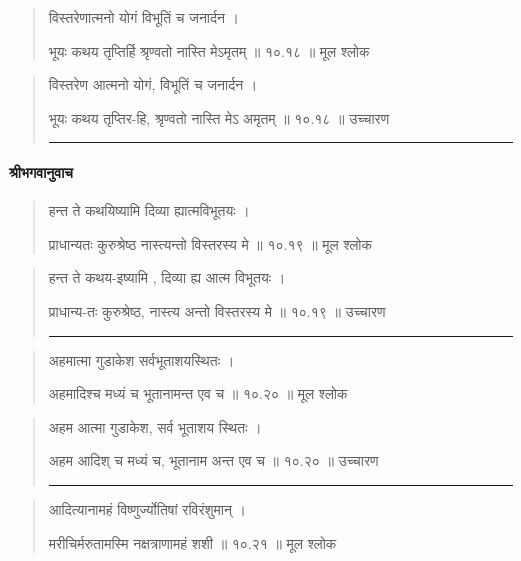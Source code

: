 \begin{quotation} 

विस्तरेणात्मनो योगं विभूतिं च जनार्दन  ।  

भूयः कथय तृप्तिर्हि श्रृण्वतो नास्ति मेऽमृतम्‌  ॥ १०.१८ ॥  मूल श्लोक
\end{quotation}

\begin{quotation}

विस्तरेण आत्मनो योगं, विभूतिं च जनार्दन  ।  

भूयः कथय तृप्तिर-हि, श्रृण्वतो नास्ति मेऽ अमृतम्‌  ॥ १०.१८ ॥  उच्चारण

\noindent\rule{16cm}{0.4pt} 
\end{quotation}

\paragraph{\sanskrit श्रीभगवानुवाच}

\begin{quotation} 


हन्त ते कथयिष्यामि दिव्या ह्यात्मविभूतयः  ।  

प्राधान्यतः कुरुश्रेष्ठ नास्त्यन्तो विस्तरस्य मे  ॥ १०.१९ ॥  मूल श्लोक
\end{quotation}

\begin{quotation}

हन्त ते कथय-इष्यामि , दिव्या ह्य आत्म विभूतयः  ।  

प्राधान्य-तः कुरुश्रेष्ठ, नास्त्य अन्तो विस्तरस्य मे  ॥ १०.१९ ॥  उच्चारण

\noindent\rule{16cm}{0.4pt} 
\end{quotation}


\begin{quotation} 

अहमात्मा गुडाकेश सर्वभूताशयस्थितः  ।  

अहमादिश्च मध्यं च भूतानामन्त एव च  ॥ १०.२० ॥  मूल श्लोक
\end{quotation}

\begin{quotation}

अहम आत्मा गुडाकेश, सर्व भूताशय स्थितः  ।  

अहम आदिश् च मध्यं च, भूतानाम अन्त एव च  ॥ १०.२० ॥  उच्चारण

\noindent\rule{16cm}{0.4pt} 
\end{quotation}


\begin{quotation} 

आदित्यानामहं विष्णुर्ज्योतिषां रविरंशुमान्‌  ।  

मरीचिर्मरुतामस्मि नक्षत्राणामहं शशी  ॥ १०.२१ ॥  मूल श्लोक
\end{quotation}

